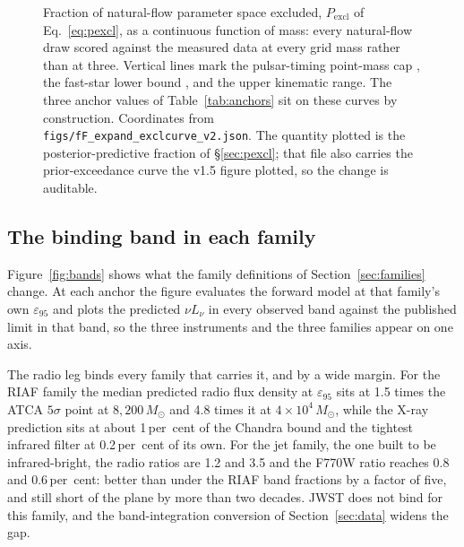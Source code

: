 \documentclass[11pt]{article}
\newcommand{\msun}{\ensuremath{M_\odot}}
\newcommand{\epsl}{\ensuremath{\varepsilon_{95}}}
\begin{document}
\begin{figure}[tbp]
\caption{Fraction of natural-flow parameter space excluded, $P_{\mathrm{excl}}$ of Eq.~\ref{eq:pexcl}, as a continuous function of mass: every natural-flow draw scored against the measured data at every grid mass rather than at three. Vertical lines mark the pulsar-timing point-mass cap \citep{BanaresHernandez2025}, the fast-star lower bound \citep{Haberle2024Nature}, and the upper kinematic range. The three anchor values of Table~\ref{tab:anchors} sit on these curves by construction. Coordinates from \texttt{figs/fF\_expand\_exclcurve\_v2.json}. The quantity plotted is the posterior-predictive fraction of \S\ref{sec:pexcl}; that file also carries the prior-exceedance curve the v1.5 figure plotted, so the change is auditable.}
\label{fig:exclcurve}
\end{figure}

\subsection{The binding band in each family}
\label{sec:bandadj}

Figure~\ref{fig:bands} shows what the family definitions of Section~\ref{sec:families} change. At each anchor the figure evaluates the forward model at that family's own $\epsl$ and plots the predicted $\nu L_{\nu}$ in every observed band against the published limit in that band, so the three instruments and the three families appear on one axis.

The radio leg binds every family that carries it, and by a wide margin. For the RIAF family the median predicted radio flux density at \epsl{} sits at 1.5 times the ATCA $5\sigma$ point at $8{,}200\,\msun$ and 4.8 times it at $4\times10^{4}\,\msun$, while the X-ray prediction sits at about 1\,per~cent of the Chandra bound and the tightest infrared filter at 0.2\,per~cent of its own. For the jet family, the one built to be infrared-bright, the radio ratios are 1.2 and 3.5 and the F770W ratio reaches 0.8 and 0.6\,per~cent: better than under the RIAF band fractions by a factor of five, and still short of the plane by more than two decades. JWST does not bind for this family, and the band-integration conversion of Section~\ref{sec:data} widens the gap.
\end{document}
